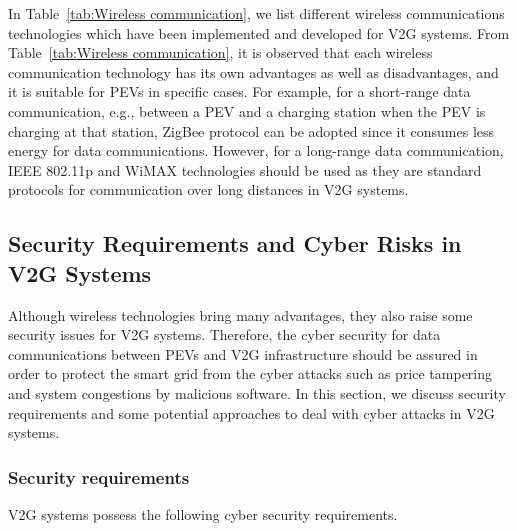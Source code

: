 \documentclass[twocolumn,10pt]{IEEEtran}
\begin{document}
In Table~\ref{tab:Wireless communication}, we list different wireless communications technologies which have been implemented and developed for V2G systems. From Table~\ref{tab:Wireless communication}, it is observed that each wireless communication technology has its own advantages as well as disadvantages, and it is suitable for PEVs in specific cases. For example, for a short-range data communication, e.g., between a PEV and a charging station when the PEV is charging at that station, ZigBee protocol can be adopted since it consumes less energy for data communications. However, for a long-range data communication, IEEE 802.11p and WiMAX technologies should be used as they are standard protocols for communication over long distances in V2G systems.


\subsection{Security Requirements and Cyber Risks in V2G Systems}

Although wireless technologies bring many advantages, they also raise some security issues for V2G systems. Therefore, the cyber security for data communications between PEVs and V2G infrastructure should be assured in order to protect the smart grid from the cyber attacks such as price tampering and system congestions by malicious software. In this section, we discuss security requirements and some potential approaches to deal with cyber attacks in V2G systems. 


\subsubsection{Security requirements}

V2G systems possess the following cyber security requirements.
\end{document}
